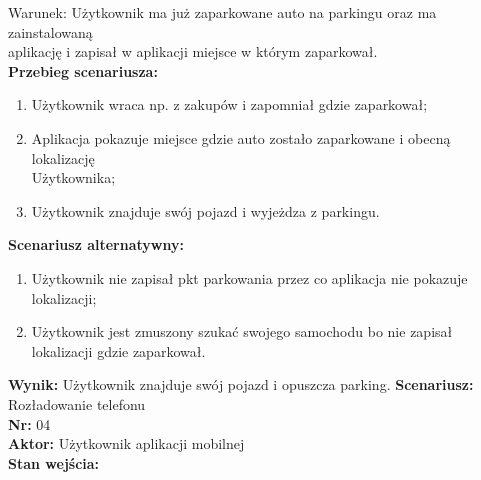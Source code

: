 \documentclass[12pt,a4paper]{article}
\begin{document}
Warunek: Użytkownik ma już zaparkowane auto na parkingu oraz ma zainstalowaną \\aplikację i zapisał w aplikacji miejsce w którym zaparkował.
\\{\bf Przebieg scenariusza:}
\begin{enumerate}
\item Użytkownik wraca np. z zakupów i zapomniał gdzie zaparkował;
\item Aplikacja pokazuje miejsce gdzie auto zostało zaparkowane i obecną lokalizację\\Użytkownika;
\item Użytkownik znajduje swój pojazd i wyjeżdza z parkingu.
\end{enumerate}
{\bf Scenariusz alternatywny:}
\begin{enumerate}
\item Użytkownik nie zapisał pkt parkowania przez co aplikacja nie pokazuje lokalizacji;
\item Użytkownik jest zmuszony szukać swojego samochodu  bo nie zapisał lokalizacji gdzie zaparkował.
\end{enumerate}
{\bf Wynik:} Użytkownik znajduje swój pojazd i opuszcza parking.
\newline\newline\newline\newline\newline\newline\newline\newline\newline\newline\newline\newline\newline\newline\newline\newline\newline\newline\newline\newline\newline\newline\newline\newline\newline\newline
{\large \bf Scenariusz:} Rozładowanie telefonu
\\{\bf Nr:} 04
\\{\bf Aktor:} Użytkownik aplikacji mobilnej
\\{\bf Stan wejścia:}
\end{document}
